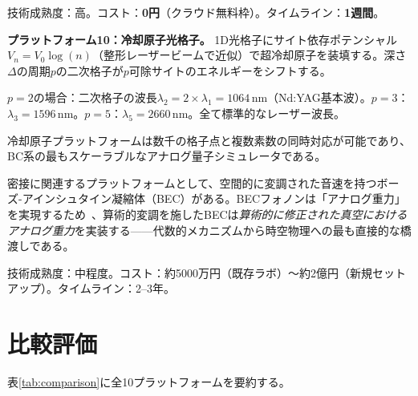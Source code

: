 \documentclass[11pt,a4paper]{article}
\begin{document}
技術成熟度：高。コスト：\textbf{0円}（クラウド無料枠）。タイムライン：\textbf{1週間}。

\textbf{プラットフォーム10：冷却原子光格子。}
1D光格子にサイト依存ポテンシャル$V_n = V_0\log(n)$（整形レーザービームで近似）で超冷却原子を装填する。深さ$\Delta$の周期$p$の二次格子が$p$可除サイトのエネルギーをシフトする。

$p = 2$の場合：二次格子の波長$\lambda_2 = 2\times\lambda_1 = 1064$\,nm（Nd:YAG基本波）。$p = 3$：$\lambda_3 = 1596$\,nm。$p = 5$：$\lambda_5 = 2660$\,nm。全て標準的なレーザー波長。

冷却原子プラットフォームは数千の格子点と複数素数の同時対応が可能であり、BC系の最もスケーラブルなアナログ量子シミュレータである。

密接に関連するプラットフォームとして、空間的に変調された音速を持つボーズ-アインシュタイン凝縮体（BEC）がある。BECフォノンは「アナログ重力」を実現するため~\cite{Unruh1981}、算術的変調を施したBECは\emph{算術的に修正された真空におけるアナログ重力}を実装する——代数的メカニズムから時空物理への最も直接的な橋渡しである。

技術成熟度：中程度。コスト：約5000万円（既存ラボ）〜約2億円（新規セットアップ）。タイムライン：2--3年。

\section{比較評価}
\label{sec:comparison}

表\ref{tab:comparison}に全10プラットフォームを要約する。
\end{document}
